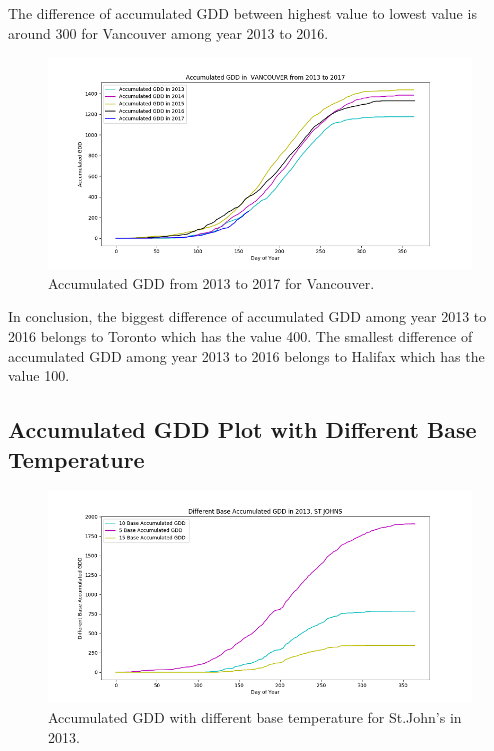 \documentclass[12pt]{article}
\begin{document}
The difference of accumulated GDD between highest value to lowest value is around 300 for Vancouver among year 2013 to 2016.
\begin{center}
\begin{figure}[H]
\includegraphics[width=5.25in]{Plot/yearvan.png}




\caption{Accumulated GDD from 2013 to 2017 for Vancouver.}
\label{5.4}
\end{figure}
\end{center}

In conclusion, the biggest difference of accumulated GDD among year 2013 to 2016 belongs to Toronto which has the value 400. The smallest difference of accumulated GDD among year 2013 to 2016 belongs to Halifax which has the value 100.

\subsection{Accumulated GDD Plot with Different Base Temperature}

\begin{center}
\begin{figure}[H]
\includegraphics[width=5.25in]{Plot/differentT_baseforStJohns.png}
\caption{Accumulated GDD with different base temperature for St.John's in 2013.}
\label{5.5}
\end{figure}
\end{center}
\end{document}
